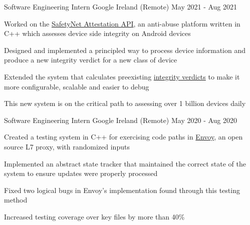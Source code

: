 \begin{cventries}
  \cventry
    {Software Engineering Intern}
    {Google}
    {Ireland (Remote)}
    {May 2021 - Aug 2021}
    {
      \begin{cvitems}
      \item Worked on the \href{https://developer.android.com/training/safetynet/attestation}{SafetyNet Attestation API}, an anti-abuse platform written in C++ which assesses device side integrity on Android devices
        \item Designed and implemented a principled way to process device information and produce a new integrity verdict for a new class of device
        \item Extended the system that calculates preexisting \href{https://developer.android.com/training/safetynet/attestation\#potential-integrity-verdicts}{integrity verdicts} to make it more configurable, scalable and easier to debug
        \item This new system is on the critical path to assessing over 1 billion devices daily
      \end{cvitems}
    }

  \cventry
    {Software Engineering Intern}
    {Google}
    {Ireland (Remote)}
    {May 2020 - Aug 2020}
    {
      \begin{cvitems}
        \item Created a testing system in C++ for exercising code paths in \href{https://github.com/envoyproxy/envoy}{Envoy}, an open source L7 proxy, with randomized inputs
        \item Implemented an abstract state tracker that maintained the correct state of the system to ensure updates were properly processed
        \item Fixed two logical bugs in Envoy's implementation found through this testing method
        \item Increased testing coverage over key files by more than 40\%
      \end{cvitems}
    }

\end{cventries}
